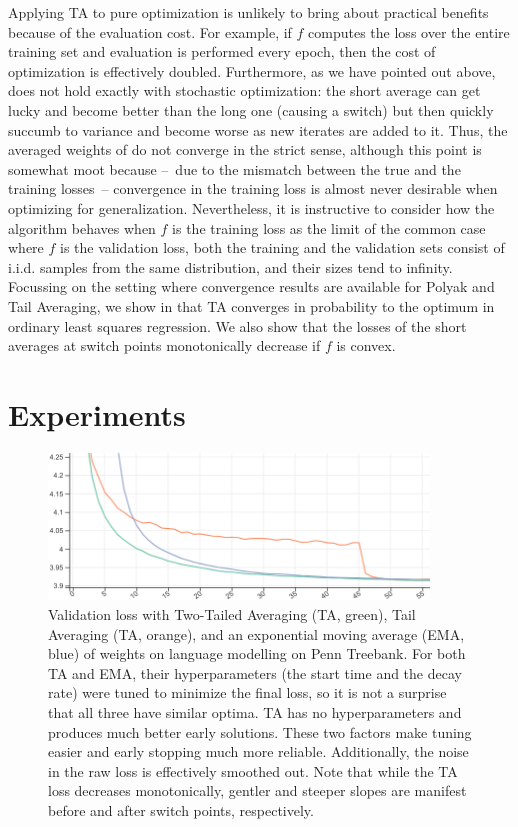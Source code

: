 \documentclass[twocolumn]{article}
\newcommand{\tta}{\textlf{2}TA}
\begin{document}
Applying \tta{} to pure optimization is unlikely to bring about practical benefits because of the evaluation cost.
For example, if $f$ computes the loss over the entire training set and evaluation is performed every epoch, then the cost of optimization is effectively doubled.
Furthermore, as we have pointed out above,  does not hold exactly with stochastic optimization: the short average can get lucky and become better than the long one (causing a switch) but then quickly succumb to variance and become worse as new iterates are added to it.
Thus, the averaged weights of  do not converge in the strict sense, although this point is somewhat moot because --~due to the mismatch between the true and the training losses~-- convergence in the training loss is almost never desirable when optimizing for generalization.
Nevertheless, it is instructive to consider how the algorithm behaves when $f$ is the training loss as the limit of the common case where $f$ is the validation loss, both the training and the validation sets consist of i.i.d. samples from the same distribution, and their sizes tend to infinity.
Focussing on the setting where convergence results are available for Polyak and Tail Averaging, we show in  that \tta{} converges in probability to the optimum in ordinary least squares regression.
We also show that the losses of the short averages at switch points monotonically decrease if $f$ is convex.


\section{Experiments}
\label{sec:tta-experiments}

\begin{figure}[t]
  \centering
  \includegraphics[width=0.9\textwidth]{figure/oswa-vs.png}
  \caption[Validation losses with Two-Tailed Averaging and baselines.]{Validation loss with Two-Tailed Averaging (\tta{}, green), Tail Averaging (TA, orange), and an exponential moving average (EMA, blue) of weights on language modelling on Penn Treebank.
For both TA and EMA, their hyperparameters (the start time and the decay rate) were tuned to minimize the final loss, so it is not a surprise that all three have similar optima.
\tta{} has no hyperparameters and produces much better early solutions.
These two factors make tuning easier and early stopping much more reliable.
Additionally, the noise in the raw loss is effectively smoothed out.
Note that while the \tta{} loss decreases monotonically, gentler and steeper slopes are manifest before and after switch points, respectively.}
  \label{fig:swa-vs-oooswa}
\end{figure}
\end{document}
